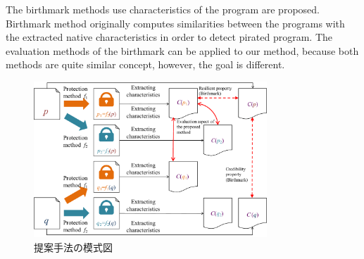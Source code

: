 \documentclass[conference]{IEEEtran}
\begin{document}
The birthmark methods use characteristics of the program are
proposed\cite{tamada05ieice}.  Birthmark method originally computes
similarities between the programs with the extracted native
characteristics in order to detect pirated program.  The evaluation
methods of the birthmark can be applied to our method, because both
methods are quite similar concept, however, the goal is different.

\begin{figure}[b]
  \centering
  \includegraphics[width=0.78\textwidth]{images/key_idea}
  \caption{提案手法の模式図}\label{fig:keyidea}
\end{figure}

% 
% 
\end{document}
